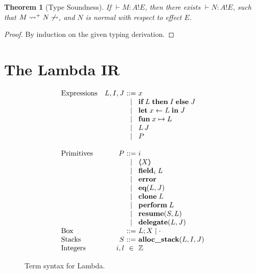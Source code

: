 \documentclass[12pt,mscres,cdtppar,twoside,openright,logo,rightchapter,normalheadings]{infthesis}
\makeatletter
\newtheorem{theorem}{Theorem}[section]
\theoremstyle{definition}
\newcommand{\slab}[1]{\textrm{#1}}
\newcommand{\revto}{\ensuremath{\leftarrow}}
\newcommand{\keyw}[1]{\textbf{#1}}
\newcommand{\Let}{\keyw{let}}
\newcommand{\In}{\keyw{in}}
\newcommand{\eff}{!}
\newcommand{\typc}[3]{#1 \vdash #2 \eff #3}
\newcommand{\reducesto}[0]{\ensuremath{\leadsto}}
\newcommand{\ba}{\begin{array}}
\newcommand{\ea}{\end{array}}
\newenvironment{syntax}{\[\ba{@{}l@{\quad}r@{~}c@{~}l@{}}}{\ea\]\ignorespacesafterend}
\makeatother
\begin{document}
\begin{theorem}[Type Soundness]
If $\typc{}{M : A}{E}$, then there exists $\typc{}{N : A}{E}$, such that
$M \reducesto^+ N \not\reducesto$, and $N$ is normal with respect to
effect $E$.
\end{theorem}
\begin{proof}
By induction on the given typing derivation.
\end{proof}

\section{The Lambda IR}
\label{sec:lambda}

\newcommand{\If}{\keyw{if}}
\newcommand{\Then}{\keyw{then}}
\newcommand{\Else}{\keyw{else}}
\newcommand{\Fun}{\keyw{fun}}
\newcommand{\Perform}{\keyw{perform}}
\newcommand{\Resume}{\keyw{resume}}
\newcommand{\Clone}{\keyw{clone}}
\newcommand{\Makeblock}{\keyw{makeblock}}
\newcommand{\Field}{\keyw{field}}
\newcommand{\Eq}{\keyw{eq}}
\newcommand{\Alloc}{\keyw{alloc\_stack}}
\newcommand{\Error}{\keyw{error}}
\newcommand{\Delegate}{\keyw{delegate}}

\newcommand{\LBox}[1]{\langle\!\!\langle #1 \rangle\!\!\rangle}

\begin{figure}
\begin{syntax}
\slab{Expressions}   &L,I,J  &::= & x\\
                     &     &\mid& \If \; L \; \Then \; I \; \Else \; J\\
                     &     &\mid& \Let \; x \revto L \; \In \; J\\
                     &     &\mid& \Fun \; x \mapsto L \\
                     &     &\mid& L\,J\\
                     &     &\mid& P\\
                     &     &    &\\
\slab{Primitives}    &P    &::= & i\\
                     &     &\mid& \LBox{X}\\
                     &     &\mid& \Field_i\; L\\
                     &     &\mid& \Error\\
                     &     &\mid& \Eq(L,J)\\
                     &     &\mid& \Clone \; L\\
                     &     &\mid& \Perform \; L \\
                     &     &\mid& \Resume(S,L) \\
                     &     &\mid& \Delegate(L,J)\\
\slab{Box}           &     &::= & L;X \mid \cdot\\
\slab{Stacks}        &S    &::= & \Alloc (L,I,J)\\
\slab{Integers}      &i,l  &\in & \mathbb{Z} 
\end{syntax}
\caption{Term syntax for Lambda.}\label{fig:lambda-terms}
\end{figure}
\end{document}
